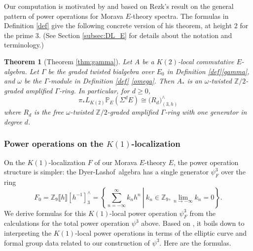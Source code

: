 \documentclass{gtpart}
\newtheorem{thm}{Theorem}
\theoremstyle{definition}
\theoremstyle{remark}
\newcommand{\mb}[1]{\mathbb{#1}}
\newcommand{\DL}{Dyer-Lashof~}
\newcommand{\BP}{{\mb P}}
\newcommand{\BZ}{{\mb Z}}
\newcommand{\G}{\Gamma}
\newcommand{\p}{\psi^3}
\numberwithin{equation}{section}
\numberwithin{thm}{section}
\begin{document}
Our computation is motivated by and based on Rezk's result 
\cite{slides, cong} on the general pattern of power operations for 
Morava $E$-theory spectra.  The formulas in Definition \ref{def} give 
the following concrete version of his theorem, at height 2 for the prime 
3.  (See Section \ref{subsec:DL_E} for details about the notation and 
terminology.)  

\begin{thm}[Theorem \ref{thm:gamma}]
 Let $A$ be a $K(2)$-local commutative $E$-algebra.  Let $\G$ be the 
 graded twisted bialgebra over $E_0$ in Definition 
 \ref{def}\thinspace \eqref{gamma}, and $\omega$ be the $\G$-module in 
 Definition \ref{def} \eqref{omega}.  Then $A_*$ is an $\omega$-twisted 
 $\BZ/2$-graded amplified $\G$-ring.  In particular, for $d \geq 0$, 
 \[
  \pi_* L_{K(2)} \BP_E (\Sigma^d E) \cong \big( R_d \big)_{(3,h)}^\wedge 
 \]
 where $R_d$ is the free $\omega$-twisted $\BZ/2$-graded amplified 
 $\G$-ring with one generator in degree $d$.  
\end{thm}

\subsubsection*{Power operations on the $K(1)$-localization}

On the $K(1)$-localization $F$ of our Morava $E$-theory $E$, the power 
operation structure is simpler: the \DL algebra has a single generator 
$\p_F$ over the ring 
\[
 F_0 = \BZ_9 \llbracket h \rrbracket [h^{-1}]_3^\wedge = 
 \left.\left\{\sum_{n = -\infty}^{\infty} k_n h^n~\right|~k_n \in \BZ_9, 
 \lim_{n \to -\infty} k_n = 0\right\}.  
\]
We derive formulas for this $K(1)$-local power operation $\p_F$ from the 
calculations for the total power operation $\p$ above.  Based on 
\cite[Sections 2.4 and 8.2]{level3}, it boils down to interpreting the 
$K(1)$-local power operations in terms of the elliptic curve and formal 
group data related to our construction of $\p$.  Here are the formulas.  
\end{document}

